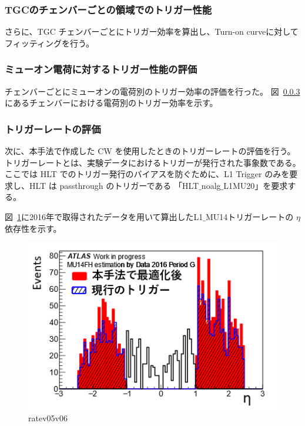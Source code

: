 

\subsubsection{TGCのチェンバーごとの領域でのトリガー性能}
さらに、TGC チェンバーごとにトリガー効率を算出し、Turn-on curveに対してフィッティングを行う。


\subsubsection{ミューオン電荷に対するトリガー性能の評価}
チェンバーごとにミューオンの電荷別のトリガー効率の評価を行った。
図~\ref{}にあるチェンバーにおける電荷別のトリガー効率を示す。



\subsubsection{トリガーレートの評価}
次に、本手法で作成した CW を使用したときのトリガーレートの評価を行う。トリガーレートとは、実験データにおけるトリガーが発行された事象数である。ここでは HLT でのトリガー発行のバイアスを防ぐために、L1 Trigger のみを要求し、HLT は passthrough のトリガーである 「HLT$\_$noalg$\_$L1MU20」を要求する。

図~\ref{fig:Ratev05v06}に2016年で取得されたデータを用いて算出したL1$\_$MU14トリガーレートの $\eta$ 依存性を示す。

\begin{figure}[tb]
  \centering
  \includegraphics[clip, width=12cm]{fig/4/rate_v05_v06.png}
  \caption{ratev05v06}
  \label{fig:Ratev05v06}
\end{figure}


